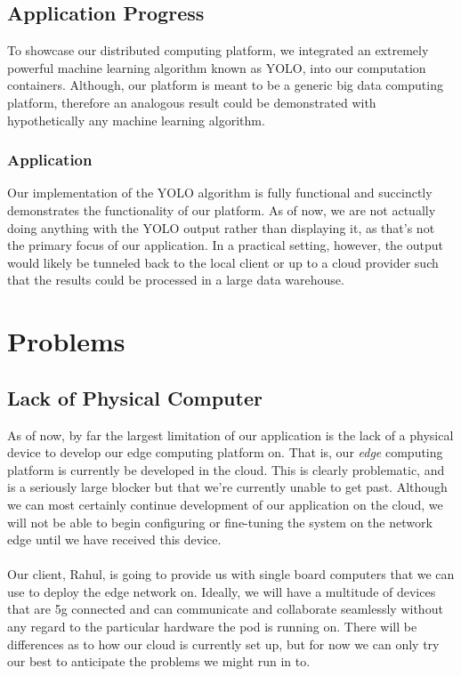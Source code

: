 \documentclass[10pt,journal,compsoc,onecolumn,draftclsnofoot]{IEEEtran}
\begin{document}
\subsection{Application Progress}
To showcase our distributed computing platform, we integrated an extremely powerful machine learning algorithm known as YOLO, into our computation containers. Although, our platform is meant to be a generic big data computing platform, therefore an analogous result could be demonstrated with hypothetically any machine learning algorithm. 

\subsubsection{Application}
Our implementation of the YOLO algorithm is fully functional and succinctly demonstrates the functionality of our platform. As of now, we are not actually doing anything with the YOLO output rather than displaying it, as that's not the primary focus of our application. In a practical setting, however, the output would likely be tunneled back to the local client or up to a cloud provider such that the results could be processed in a large data warehouse.

\section{Problems}
\subsection{Lack of Physical Computer}
As of now, by far the largest limitation of our application is the lack of a physical device to develop our edge computing platform on. That is, our \textit{edge} computing platform is currently be developed in the cloud. This is clearly problematic, and is a seriously large blocker but that we're currently unable to get past. Although we can most certainly continue development of our application on the cloud, we will not be able to begin configuring or fine-tuning the system on the network edge until we have received this device. \\
\hspace*{.5cm}\\
Our client, Rahul, is going to provide us with single board computers that we can use to deploy the edge network on. Ideally, we will have a multitude of devices that are 5g connected and can communicate and collaborate seamlessly without any regard to the particular hardware the pod is running on. There will be differences as to how our cloud is currently set up, but for now we can only try our best to anticipate the problems we might run in to. 
\end{document}
